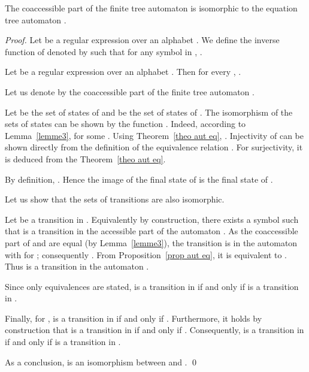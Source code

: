 \documentclass{llncs}
\begin{document}
\begin{proposition}\label{prop coacc part quot eq}
The coaccessible part of the finite tree automaton  is isomorphic to the equation tree automaton .
\end{proposition}
\begin{proof}


Let  be a regular expression over an alphabet . We define the inverse function of  denoted by  such that for any symbol  in , . 
 
\begin{theorem}\label{theo aut eq}
  Let  be a regular expression over an alphabet . Then for every , .
\end{theorem}




  Let us denote by  the coaccessible part of the finite tree automaton .
  
  Let  be the set of states of  and  be the set of states of . The isomorphism of the sets of states can be shown by the function . Indeed, according to Lemma~\ref{lemme3},  for some . Using Theorem~\ref{theo aut eq}, . Injectivity of  can be shown  directly from the definition of the equivalence relation . For surjectivity, it is deduced from the Theorem~\ref{theo aut eq}.
  
  By definition, . Hence the image of the final state of  is the final state of .
  
  Let us show that the sets of transitions are also isomorphic.
  
  Let  be a transition in . Equivalently by construction, there exists a symbol  such that  is a transition in the accessible part of the automaton . As the coaccessible part of  and  are equal (by Lemma~\ref{lemme3}), the transition  is in the automaton  with  for ; consequently .  From Proposition~\ref{prop aut eq}, it is equivalent to . Thus  is a transition in the automaton . 
  
  Since only equivalences are stated,  is a transition in  if and only if  is a transition in . 
   
  Finally, for ,  is a transition in  if and only if . Furthermore, it holds by construction that  is a transition in  if and only if . Consequently,  is a transition in  if and only if  is a transition in .
  
  As a conclusion,  is an isomorphism between  and .
 \qed
\end{proof}
\end{document}
